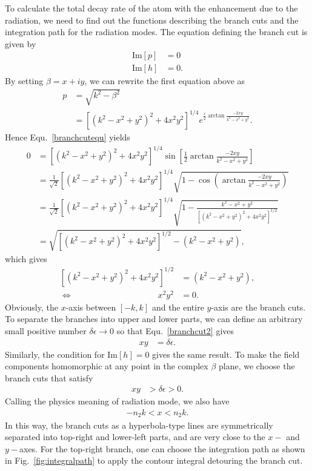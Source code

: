 \documentclass[]{report}
\begin{document}
To calculate the total decay rate of the atom with the enhancement due to the radiation, we need to find out the functions describing the branch cuts and the integration path for the radiation modes. The equation defining the branch cut is given by
\begin{align}\label{branchcutequ}
\mathrm{Im}\left[p \right] &=0\\
\mathrm{Im}\left[h\right] &=0.
\end{align}
By setting $ \beta=x+iy $, we can rewrite the first equation above as
\begin{align}
p&=\sqrt{k^2-\beta^2}\\
&=\left[(k^2-x^2+y^2)^2 + 4x^2y^2 \right]^{1/4}e^{\frac{i}{2}\arctan\frac{-2xy}{k^2-x^2+y^2}}.
\end{align}
Hence Equ.~\ref{branchcutequ} yields
\begin{align}
0&= \left[(k^2-x^2+y^2)^2 + 4x^2y^2 \right]^{1/4} \sin \left[\frac{1}{2}\arctan\frac{-2xy}{k^2-x^2+y^2} \right]\\
&= \frac{1}{\sqrt{2}} \left[(k^2\!-\! x^2\!+\! y^2)^2 \!+\! 4x^2y^2 \right]^{1/4} \sqrt{1\!-\!\cos \left(\arctan\frac{-2xy}{k^2\!-\! x^2\!+\! y^2} \right)}\\
&= \frac{1}{\sqrt{2}} \left[(k^2\!-\!x^2\!+\! y^2)^2 \!+\! 4x^2y^2 \right]^{1/4} \sqrt{1\!-\! \frac{k^2\!-\! x^2\!+\! y^2}{\left[(k^2\!-\! x^2\!+\! y^2)^2 \!+\! 4x^2y^2 \right]^{1/2}} }\\
&=\sqrt{\left[(k^2-x^2+y^2)^2 + 4x^2y^2 \right]^{1/2}-(k^2-x^2+y^2)},
\end{align}
which gives
\begin{align}
\left[(k^2-x^2+y^2)^2 + 4x^2y^2 \right]^{1/2}&=(k^2-x^2+y^2),\\
\Leftrightarrow \qquad \qquad \qquad \qquad \qquad x^2y^2&=0.\label{branchcut2}
\end{align}
Obviously, the $ x $-axis between $ [-k,k] $ and the entire $ y $-axis are the branch cuts. To separate the branches into upper and lower parts, we can define an arbitrary small positive number $ \delta\epsilon\rightarrow 0 $ so that Equ.~\ref{branchcut2} gives
\begin{align}
xy&=\delta\epsilon.
\end{align}
Similarly, the condition for $ \mathrm{Im}[h]=0 $ gives the same result. To make the field components homomorphic at any point in the complex $ \beta $ plane, we choose the branch cuts that satisfy 
\begin{align}
xy&>\delta\epsilon>0.
\end{align}
Calling the physics meaning of radiation mode, we also have 
\begin{align}
-n_2k<x<n_2k.
\end{align}
In this way, the branch cuts as a hyperbola-type lines are symmetrically separated into top-right and lower-left parts, and are very close to the $ x- $ and $ y- $axes. For the top-right branch, one can choose the integration path as shown in Fig.~\ref{fig:integralpath} to apply the contour integral detouring the branch cut. 
\end{document}
